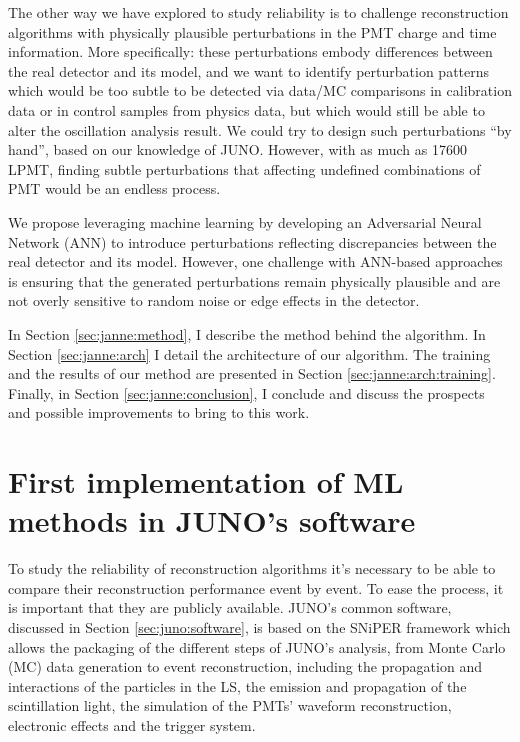 \documentclass[../main.tex]{subfiles}
\begin{document}
The other way we have explored to study reliability is to challenge reconstruction algorithms with physically plausible perturbations in the PMT charge and time information. More specifically: these perturbations embody differences between the real detector and its model,  and we want to identify perturbation patterns which  would be too subtle to be detected via data/MC comparisons in calibration data or in control samples from physics data, but which would still be able to alter the oscillation analysis result.  We could try to design such perturbations ``by hand'', based on our knowledge of JUNO. However, with as much as 17600 LPMT, finding subtle perturbations that affecting undefined combinations of PMT would be an endless process.

We propose leveraging machine learning by developing an Adversarial Neural Network (ANN) to introduce perturbations reflecting discrepancies between the real detector and its model. However, one challenge with ANN-based approaches is ensuring that the generated perturbations remain physically plausible and are not overly sensitive to random noise or edge effects in the detector.

In Section \ref{sec:janne:method}, I describe the method behind the algorithm. In Section \ref{sec:janne:arch} I detail the architecture of our algorithm.
The training and the results of our method are presented in Section \ref{sec:janne:arch:training}. Finally, in Section \ref{sec:janne:conclusion}, I conclude and discuss the prospects and possible improvements to bring to this work.


\section{First implementation of ML methods in JUNO's software}
\label{sec:janne:BDTE}

To study the reliability of reconstruction algorithms it's necessary to be able to compare their reconstruction performance event by event. To ease the process, it is important that they are publicly available. JUNO's common software, discussed in Section \ref{sec:juno:software}, is based on the SNiPER framework \cite{lin_application_2017} which allows the packaging of the different steps of JUNO's analysis, from Monte Carlo (MC) data generation to event reconstruction, including the propagation and interactions of the particles in the LS, the emission and propagation of the scintillation light, the simulation of the PMTs' waveform reconstruction, electronic effects and the trigger system.
\end{document}
